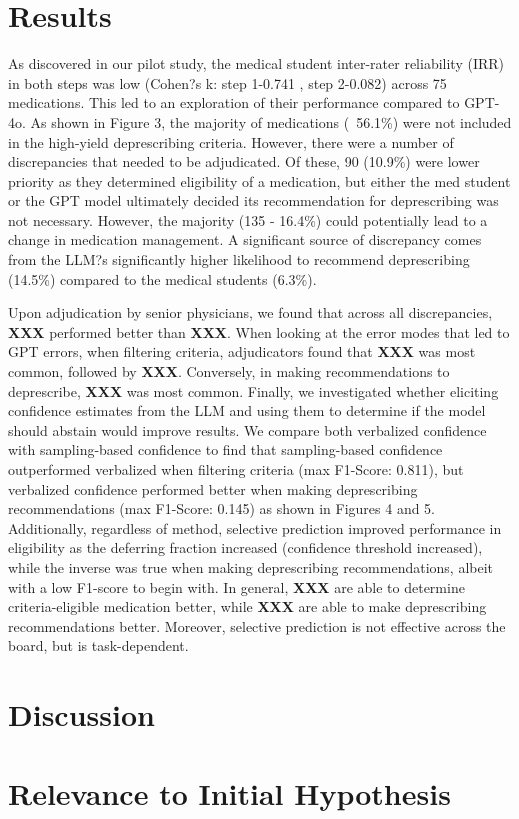 \section{Results}

As discovered in our pilot study, the medical student inter-rater reliability (IRR) in both steps was low (Cohen?s k: step 1-0.741 , step 2-0.082) across 75 medications. This led to an exploration of their performance compared to GPT-4o. As shown in Figure 3, the majority of medications (~56.1\%) were not included in the high-yield deprescribing criteria. However, there were a number of discrepancies that needed to be adjudicated. Of these, 90 (10.9\%) were lower priority as they determined eligibility of a medication, but either the med student or the GPT model ultimately decided its recommendation for deprescribing was not necessary. However, the majority (135 - 16.4\%) could potentially lead to a change in medication management. A significant source of discrepancy comes from the LLM?s significantly higher likelihood to recommend deprescribing (14.5\%) compared to the medical students (6.3\%). 

Upon adjudication by senior physicians, we found that across all discrepancies, \textbf{XXX} performed better than \textbf{XXX}. When looking at the error modes that led to GPT errors, when filtering criteria, adjudicators found that \textbf{XXX} was most common, followed by \textbf{XXX}. Conversely, in making recommendations to deprescribe, \textbf{XXX} was most common. 
Finally, we investigated whether eliciting confidence estimates from the LLM and using them to determine if the model should abstain would improve results. We compare both verbalized confidence with sampling-based confidence to find that sampling-based confidence outperformed verbalized when filtering criteria (max F1-Score: 0.811), but verbalized confidence performed better when making deprescribing recommendations (max F1-Score: 0.145) as shown in Figures 4 and 5. Additionally, regardless of method, selective prediction improved performance in eligibility as the deferring fraction increased (confidence threshold increased), while the inverse was true when making deprescribing recommendations, albeit with a low F1-score to begin with. In general, \textbf{XXX} are able to determine criteria-eligible medication better, while \textbf{XXX} are able to make deprescribing recommendations better. Moreover, selective prediction is not effective across the board, but is task-dependent. 


\section{Discussion}
\section{Relevance to Initial Hypothesis}
